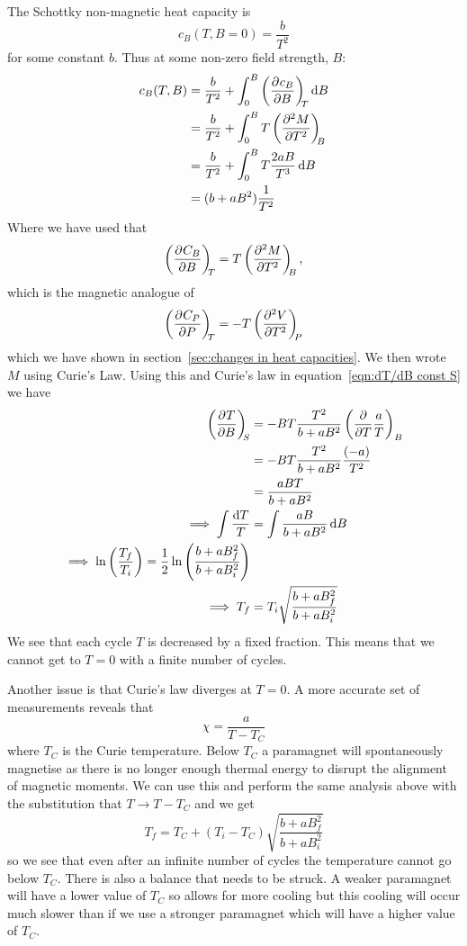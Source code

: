 \documentclass[a4paper]{article}
\begin{document}
    The Schottky non-magnetic heat capacity is
    \[c_B(T, B = 0) = \frac{b}{T^2}\]
    for some constant \(b\).
    Thus at some non-zero field strength, \(B\):
    \begin{align*}
        c_B(T, B) &= \frac{b}{T^2} + \int_0^B \left(\pdv[]{c_B}{B}\right)_{\!\!{T}} \dd{B}\\
        &= \frac{b}{T^2} + \int_0^B T\left(\pdv[2]{M}{T}\right)_{\!\!{B}}\\
        &= \frac{b}{T^2} + \int_0^B T\frac{2aB}{T^3}\dd{B}\\
        &= (b + aB^2)\frac{1}{T^2}
    \end{align*}
    Where we have used that
    \[\left(\pdv[]{C_B}{B}\right)_{\!\!{T}} = T\left(\pdv[2]{M}{T}\right)_{\!\!{B}},\]
    which is the magnetic analogue of
    \[\left(\pdv[]{C_P}{P}\right)_{\!\!{T}} = -T\left(\pdv[2]{V}{T}\right)_{\!\!{P}}\]
    which we have shown in section~\ref{sec:changes in heat capacities}.
    We then wrote \(M\) using Curie's Law.
    Using this and Curie's law in equation~\ref{eqn:dT/dB const S} we have
    \begin{align*}
        \left(\pdv[]{T}{B}\right)_{\!\!{S}} &= -BT\frac{T^2}{b + aB^2}\left(\pdv{T}\frac{a}{T}\right)_B\\
        &= -BT\frac{T^2}{b + aB^2}\frac{(-a)}{T^2}\\
        &= \frac{aBT}{b + aB^2}\\
        \implies \int \frac{\dd{T}}{T} &= \int \frac{aB}{b + aB^2}\dd{B}\\
        \implies \ln\left(\frac{T_f}{T_i}\right) = \frac{1}{2}\ln\left(\frac{b + aB_f^2}{b + aB_i^2}\right)\\
        \implies T_f &= T_i\sqrt{\frac{b + aB_f^2}{b + aB_i^2}}
    \end{align*}
    We see that each cycle \(T\) is decreased by a fixed fraction.
    This means that we cannot get to \(T = 0\) with a finite number of cycles.
    
    Another issue is that Curie's law diverges at \(T = 0\).
    A more accurate set of measurements reveals that
    \[\chi = \frac{a}{T - T_C}\]
    where \(T_C\) is the Curie temperature.
    Below \(T_C\) a paramagnet will spontaneously magnetise as there is no longer enough thermal energy to disrupt the alignment of magnetic moments.
    We can use this and perform the same analysis above with the substitution that \(T \rightarrow T - T_C\) and we get
    \[T_f = T_C + (T_i - T_C)\sqrt{\frac{b + aB_f^2}{b + aB_i^2}}\]
    so we see that even after an infinite number of cycles the temperature cannot go below \(T_C\).
    There is also a balance that needs to be struck.
    A weaker paramagnet will have a lower value of \(T_C\) so allows for more cooling but this cooling will occur much slower than if we use a stronger paramagnet which will have a higher value of \(T_C\).
    
\end{document}
